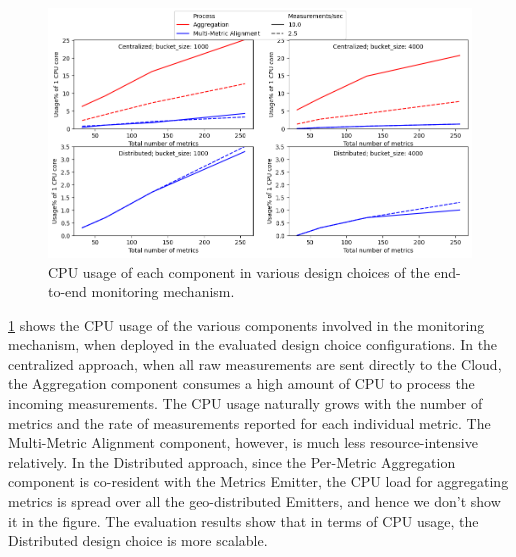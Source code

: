 \begin{figure}
\centering
\includegraphics[width=\linewidth]{figures/design_space/monitoring/cpu_usage.png}
\caption{CPU usage of each component in various design choices of the end-to-end monitoring mechanism.}
\label{fig:monitoring_cpu_usage}
\end{figure}
\cref{fig:monitoring_cpu_usage} shows the CPU usage of the various components involved in the monitoring mechanism, when deployed in the evaluated design choice configurations. In the centralized approach, when all raw measurements are sent directly to the Cloud, the Aggregation component consumes a high amount of CPU to process the incoming measurements. The CPU usage naturally grows with the number of metrics and the rate of measurements reported for each individual metric. The Multi-Metric Alignment component, however, is much less resource-intensive relatively. In the Distributed approach, since the Per-Metric Aggregation component is co-resident with the Metrics Emitter, the CPU load for aggregating metrics is spread over all the geo-distributed Emitters, and hence we don't show it in the figure. The evaluation results show that in terms of CPU usage, the Distributed design choice is more scalable.

